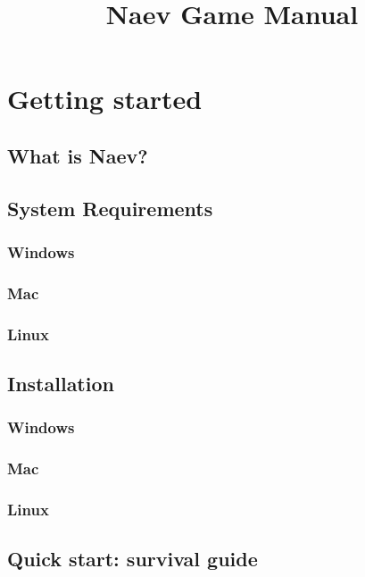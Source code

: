 \documentclass[a4paper,11pt,oneside,notitlepage,openany]{book}
\begin{document}
% 

\title{Naev Game Manual}
\maketitle

\chapter{Getting started}

\section{What is Naev?}

\section{System Requirements}
\subsection{Windows}
\subsection{Mac}
\subsection{Linux}

\section{Installation}
\subsection{Windows}
\subsection{Mac}
\subsection{Linux}

\section{Quick start: survival guide}
\end{document}
